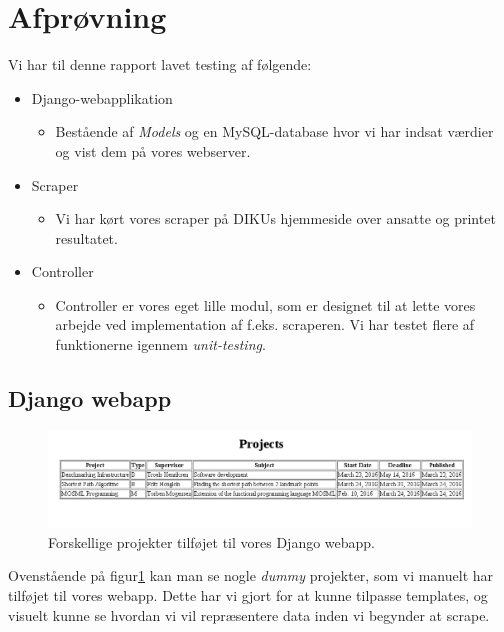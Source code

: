 \documentclass[11pt]{article}
\begin{document}
\section{Afprøvning}
Vi har til denne rapport lavet testing af følgende:
\begin{itemize}
\item Django-webapplikation
	\begin{itemize}
	\item Bestående af \textit{Models} og en MySQL-database hvor vi har indsat værdier og vist dem på vores webserver.
	\end{itemize}
\item Scraper
	\begin{itemize}
	\item Vi har kørt vores scraper på DIKUs hjemmeside over ansatte og printet resultatet.
	\end{itemize}
\item Controller
	\begin{itemize}
	\item Controller er vores eget lille modul, som er designet til at lette vores arbejde ved implementation af f.eks. scraperen. Vi har testet flere af funktionerne igennem \textit{unit-testing}.
	\end{itemize}
\end{itemize}
\subsection{Django webapp}
\begin{figure}[H]
			\centering
			\includegraphics[width=1.0\textwidth]{projects.png}
			\caption{Forskellige projekter tilføjet til vores Django webapp.}
			\label{fig:projects}
\end{figure}
Ovenstående på figur\ref{fig:projects} kan man se nogle \textit{dummy} projekter, som vi manuelt har tilføjet til vores webapp. Dette har vi gjort for at kunne tilpasse templates, og visuelt kunne se hvordan vi vil repræsentere data inden vi begynder at scrape.
\end{document}
